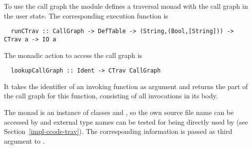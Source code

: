 To use the call graph the  module defines a traversal monad  
with the call graph in the user state. The corresponding execution function is
\begin{verbatim}
  runCTrav :: CallGraph -> DefTable -> (String,(Bool,[String])) -> CTrav a -> IO a
\end{verbatim}
The monadic action to access the call graph is
\begin{verbatim}
  lookupCallGraph :: Ident -> CTrav CallGraph
\end{verbatim}
It takes the identifier of an invoking function as argument and returns the part of the call graph for this function,
consisting of all invocations in its body.

The monad  is an instance of classes  and , so the own source file 
name can be accessed by  and external type names can be tested for being directly used by 
 (see Section~\ref{impl-ccode-trav}). The corresponding information is passed as third argument
to .
